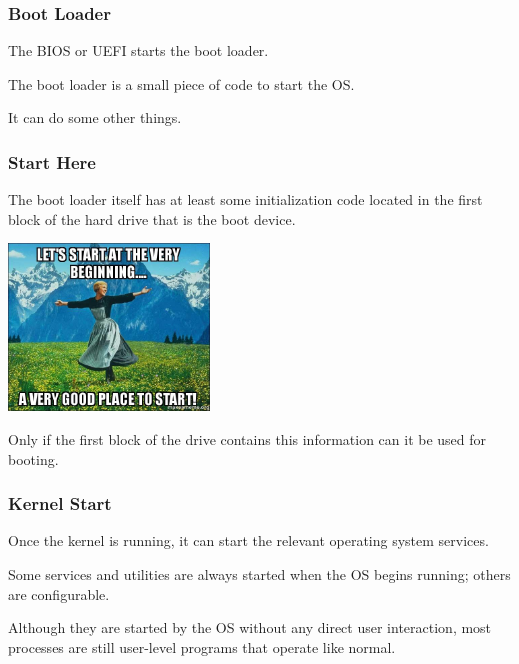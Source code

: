 \begin{frame}
\frametitle{Boot Loader}

The BIOS or UEFI starts the boot loader.

The boot loader is a small piece of code to start the OS.

It can do some other things.

\end{frame}

\begin{frame}
\frametitle{Start Here}

The boot loader itself has at least some initialization code located in the first block of the hard drive that is the boot device.

\begin{center}
	\includegraphics[width=0.4\textwidth]{images/start-beginning.jpg}
\end{center}

Only if the first block of the drive contains this information can it be used for booting.

\end{frame}

\begin{frame}
\frametitle{Kernel Start}

Once the kernel is running, it can start the relevant operating system services.

Some services and utilities are always started when the OS begins running; others are configurable.

Although they are started by the OS without any direct user interaction, most processes are still user-level programs that operate like normal.

\end{frame}

